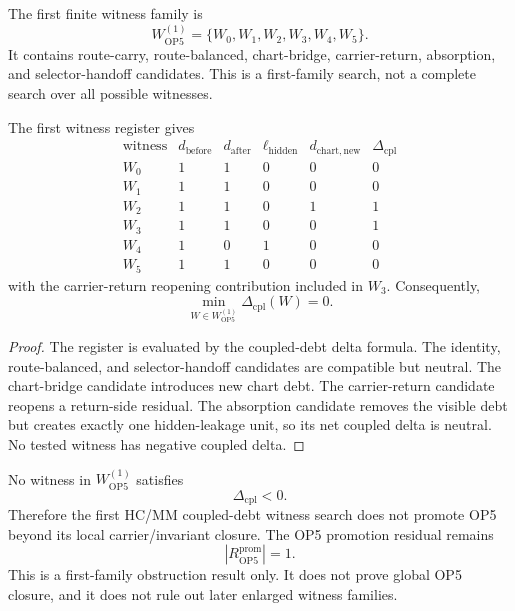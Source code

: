 \begin{definition}
The first finite witness family is
\[
    W_{\mathrm{OP5}}^{(1)}
    =
    \{W_0,W_1,W_2,W_3,W_4,W_5\}.
\]
It contains route-carry, route-balanced, chart-bridge, carrier-return,
absorption, and selector-handoff candidates. This is a first-family search,
not a complete search over all possible witnesses.
\end{definition}

\begin{proposition}
The first witness register gives
\[
\begin{array}{c|r|r|r|r|r}
\text{witness} & d_{\mathrm{before}} & d_{\mathrm{after}} &
\ell_{\mathrm{hidden}} & d_{\mathrm{chart,new}} &
\Delta_{\mathrm{cpl}}\\
\hline
W_0 & 1 & 1 & 0 & 0 & 0\\
W_1 & 1 & 1 & 0 & 0 & 0\\
W_2 & 1 & 1 & 0 & 1 & 1\\
W_3 & 1 & 1 & 0 & 0 & 1\\
W_4 & 1 & 0 & 1 & 0 & 0\\
W_5 & 1 & 1 & 0 & 0 & 0
\end{array}
\]
with the carrier-return reopening contribution included in \(W_3\).
Consequently,
\[
    \min_{W\in W_{\mathrm{OP5}}^{(1)}}
    \Delta_{\mathrm{cpl}}(W)
    =
    0.
\]
\end{proposition}

\begin{proof}
The register is evaluated by the coupled-debt delta formula. The identity,
route-balanced, and selector-handoff candidates are compatible but neutral.
The chart-bridge candidate introduces new chart debt. The carrier-return
candidate reopens a return-side residual. The absorption candidate removes the
visible debt but creates exactly one hidden-leakage unit, so its net coupled
delta is neutral. No tested witness has negative coupled delta.
\end{proof}

\begin{theorem}
No witness in \(W_{\mathrm{OP5}}^{(1)}\) satisfies
\[
    \Delta_{\mathrm{cpl}}<0.
\]
Therefore the first HC/MM coupled-debt witness search does not promote OP5
beyond its local carrier/invariant closure. The OP5 promotion residual remains
\[
    |R_{\mathrm{OP5}}^{\mathrm{prom}}|=1.
\]
This is a first-family obstruction result only. It does not prove global OP5
closure, and it does not rule out later enlarged witness families.
\end{theorem}


